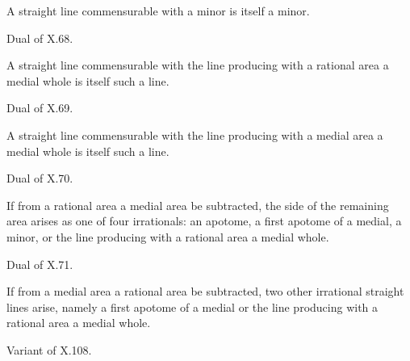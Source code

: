 \begin{claim}
\label{prop:X.105}
A straight line commensurable with a minor is itself a minor.
\end{claim}
\begin{evidence}[Proof of X.105]
\label{ev:X.105}
Dual of X.68.
\end{evidence}

\begin{claim}
\label{prop:X.106}
A straight line commensurable with the line producing with a rational
area a medial whole is itself such a line.
\end{claim}
\begin{evidence}[Proof of X.106]
\label{ev:X.106}
Dual of X.69.
\end{evidence}

\begin{claim}
\label{prop:X.107}
A straight line commensurable with the line producing with a medial
area a medial whole is itself such a line.
\end{claim}
\begin{evidence}[Proof of X.107]
\label{ev:X.107}
Dual of X.70.
\end{evidence}

\begin{claim}
\label{prop:X.108}
If from a rational area a medial area be subtracted, the side of the
remaining area arises as one of four irrationals: an apotome, a
first apotome of a medial, a minor, or the line producing with a
rational area a medial whole.
\end{claim}
\begin{evidence}[Proof of X.108]
\label{ev:X.108}
Dual of X.71.
\end{evidence}

\begin{claim}
\label{prop:X.109}
If from a medial area a rational area be subtracted, two other
irrational straight lines arise, namely a first apotome of a medial
or the line producing with a rational area a medial whole.
\end{claim}
\begin{evidence}[Proof of X.109]
\label{ev:X.109}
Variant of X.108.
\end{evidence}


